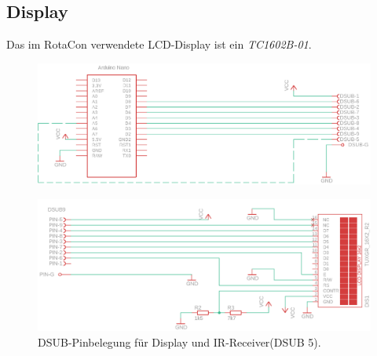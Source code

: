 \documentclass[11pt, titlepage, fleqn]{report}
\begin{document}
			\subsection{Display}
				Das im RotaCon verwendete LCD-Display ist ein \textit{TC1602B-01}.
				\begin{figure}[htbp]
					\includegraphics[width=\linewidth]{./img/dsub2.png}
					\label{fig:imgDisplay}
				\end{figure}
			\begin{figure}[htbp]
				\includegraphics[width=\linewidth]{./img/display2.png}
				\caption{DSUB-Pinbelegung für Display und IR-Receiver(DSUB 5).
				\label{fig:imgDSUB}}
			\end{figure}
\end{document}
